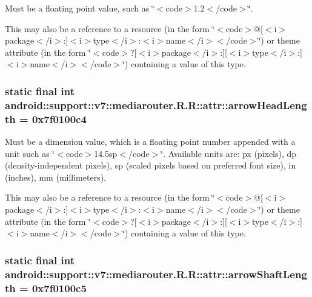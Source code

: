 Must be a floating point value, such as \char`\"{}$<$code$>$1.2$<$/code$>$\char`\"{}. 

This may also be a reference to a resource (in the form \char`\"{}$<$code$>$@\mbox{[}$<$i$>$package$<$/i$>$:\mbox{]}$<$i$>$type$<$/i$>$:$<$i$>$name$<$/i$>$$<$/code$>$\char`\"{}) or theme attribute (in the form \char`\"{}$<$code$>$?\mbox{[}$<$i$>$package$<$/i$>$:\mbox{]}\mbox{[}$<$i$>$type$<$/i$>$:\mbox{]}$<$i$>$name$<$/i$>$$<$/code$>$\char`\"{}) containing a value of this type. \hypertarget{classandroid_1_1support_1_1v7_1_1mediarouter_1_1_r_1_1attr_3d25f31e64f13e63efc9621415977e50}{
\subsubsection[{arrowHeadLength}]{\setlength{\rightskip}{0pt plus 5cm}static final int android::support::v7::mediarouter.R.R::attr::arrowHeadLength = 0x7f0100c4}}
\label{classandroid_1_1support_1_1v7_1_1mediarouter_1_1_r_1_1attr_3d25f31e64f13e63efc9621415977e50}


Must be a dimension value, which is a floating point number appended with a unit such as \char`\"{}$<$code$>$14.5sp$<$/code$>$\char`\"{}. Available units are: px (pixels), dp (density-independent pixels), sp (scaled pixels based on preferred font size), in (inches), mm (millimeters). 

This may also be a reference to a resource (in the form \char`\"{}$<$code$>$@\mbox{[}$<$i$>$package$<$/i$>$:\mbox{]}$<$i$>$type$<$/i$>$:$<$i$>$name$<$/i$>$$<$/code$>$\char`\"{}) or theme attribute (in the form \char`\"{}$<$code$>$?\mbox{[}$<$i$>$package$<$/i$>$:\mbox{]}\mbox{[}$<$i$>$type$<$/i$>$:\mbox{]}$<$i$>$name$<$/i$>$$<$/code$>$\char`\"{}) containing a value of this type. \hypertarget{classandroid_1_1support_1_1v7_1_1mediarouter_1_1_r_1_1attr_be432544080cb2d6dfb9999cf27fe85a}{
\subsubsection[{arrowShaftLength}]{\setlength{\rightskip}{0pt plus 5cm}static final int android::support::v7::mediarouter.R.R::attr::arrowShaftLength = 0x7f0100c5}}
\label{classandroid_1_1support_1_1v7_1_1mediarouter_1_1_r_1_1attr_be432544080cb2d6dfb9999cf27fe85a}


